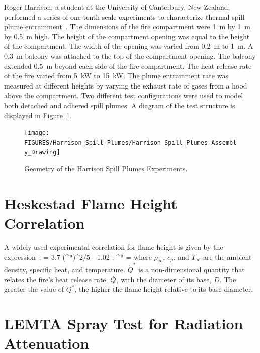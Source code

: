 Roger Harrison, a student at the University of Canterbury, New Zealand, performed a series of one-tenth scale experiments to characterize thermal spill plume
entrainment~\cite{Harrison:2009,Harrison:IAFSS2008,Harrison:FT2007,Harrison:FSJ2010}. The dimensions of the fire compartment were 1~m by 1~m by 0.5~m high.
The height of the compartment opening was equal to the height of the compartment. The width of the opening was varied from 0.2~m to 1~m.
A 0.3~m balcony was attached to the top of the compartment opening. The balcony extended 0.5~m beyond each side of the fire compartment.
The heat release rate of the fire varied from 5~kW to 15~kW.
The plume entrainment rate was measured at different heights by varying the exhaust rate of gases from a hood above the compartment.
Two different test configurations were used to model both detached and adhered spill plumes. A diagram of the test structure is displayed in Figure~\ref{Harrison_Drawing}.

\begin{figure}[ht]
\begin{center}
\vspace{-2in}
\texttt{[image: FIGURES/Harrison\_Spill\_Plumes/Harrison\_Spill\_Plumes\_Assembly\_Drawing]}
\end{center}
\vspace{-1.5in}
\caption{Geometry of the Harrison Spill Plumes Experiments.}
\label{Harrison_Drawing}
\end{figure}




\section{Heskestad Flame Height Correlation}

A widely used experimental correlation for flame height is given by the expression~\cite{Heskestad:FSJ1983,SFPE:Heskestad}:
\be
    = 3.7 \; (^*)^{2/5} - 1.02  \quad ; \quad {}^* = 
\ee
where $\rho_\infty$, $c_p$, and $T_\infty$ are the ambient density, specific heat, and temperature. $\dot{Q}^*$ is a non-dimensional quantity that relates the fire's heat release rate, $\dot{Q}$, with the diameter of its base, $D$. The greater the value of $Q^*$, the higher the flame height relative to its base diameter.


\section{LEMTA Spray Test for Radiation Attenuation}

